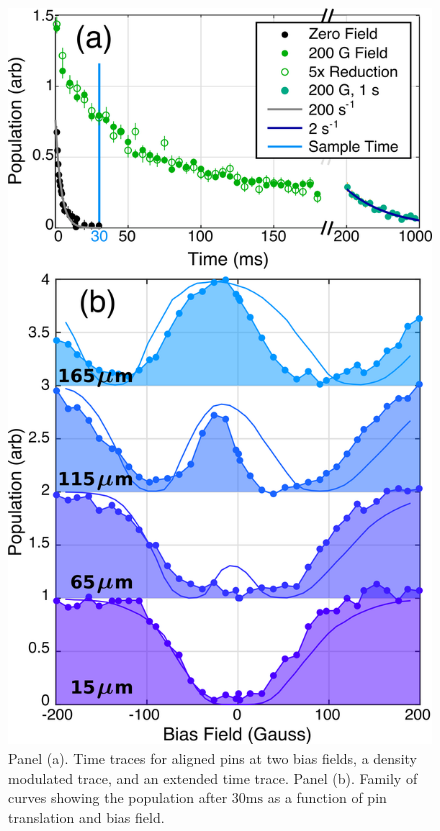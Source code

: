 \documentclass[%
 reprint,
groupedaddress,
 amsmath,amssymb,
 aps,
prl,
]{revtex4-1}
\begin{document}
\begin{figure}[tb]
\includegraphics[width=\linewidth]{VWFig/tim-style-by-dave-1hz-blues.png}%
\caption{
Panel (a). Time traces for aligned pins at two bias fields, a density modulated trace, and an extended time trace. Panel (b). Family of curves showing the population after $30 \text{ms}$ as a function of pin translation and bias field.
\label{fig:WVplot}}
\end{figure}
\end{document}
